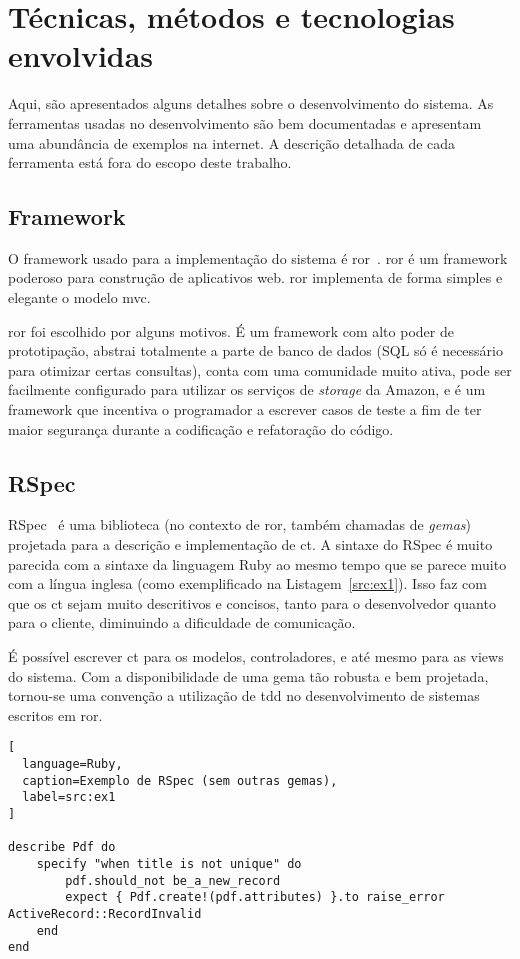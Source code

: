 \section{Técnicas, métodos e tecnologias envolvidas}

Aqui, são apresentados alguns detalhes sobre o desenvolvimento do sistema.
As ferramentas usadas no desenvolvimento são bem documentadas e apresentam uma abundância de
exemplos na internet. A descrição detalhada de cada ferramenta está fora do escopo deste trabalho.


\subsection{Framework}

O framework usado para a implementação do sistema é \gls{ror}~\cite{RoR}.
\gls{ror} é um framework poderoso para construção de aplicativos web. \gls{ror} implementa de forma simples e elegante
o modelo \gls{mvc}.

\gls{ror} foi escolhido por alguns motivos. É um framework com alto poder de prototipação, abstrai totalmente
a parte de banco de dados (SQL só é necessário para otimizar certas consultas), conta com uma comunidade muito ativa,
pode ser facilmente configurado para utilizar os serviços de \textit{storage} da Amazon, e é um framework que
incentiva o programador a escrever casos de teste a fim de ter maior segurança durante a codificação e refatoração do código.

\subsection{RSpec}

RSpec~\cite{RSpec} é uma biblioteca (no contexto de \gls{ror}, também chamadas de \textit{gemas}) projetada para a descrição e implementação de
\gls{ct}. A sintaxe do RSpec é muito parecida com a sintaxe da linguagem Ruby ao mesmo tempo que se parece muito com a língua inglesa
(como exemplificado na Listagem~\ref{src:ex1}).
Isso faz com que os \gls{ct} sejam muito descritivos e concisos, tanto para o desenvolvedor quanto para o cliente, diminuindo a dificuldade
de comunicação.

É possível escrever \gls{ct} para os modelos, controladores, e até mesmo para as views do sistema. Com a disponibilidade de uma gema
tão robusta e bem projetada, tornou-se uma convenção a utilização de \gls{tdd} no desenvolvimento de sistemas escritos em \gls{ror}.

\begin{lstlisting}[
  language=Ruby,
  caption=Exemplo de RSpec (sem outras gemas),
  label=src:ex1
]

describe Pdf do
	specify "when title is not unique" do
		pdf.should_not be_a_new_record
		expect { Pdf.create!(pdf.attributes) }.to raise_error ActiveRecord::RecordInvalid
	end
end

\end{lstlisting}

